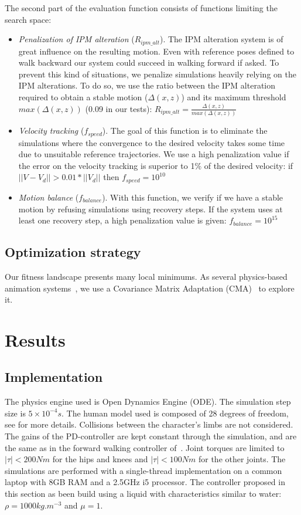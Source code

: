 \documentclass[conference]{acmsiggraph}
\begin{document}
The second part of the evaluation function consists of functions limiting the search space:
\begin{itemize}
\item{\textit{Penalization of IPM alteration} ($R_{ipm\_alt}$). The IPM alteration system is of great influence on the resulting motion. Even with reference poses defined to walk backward our system could succeed in walking forward if asked. To prevent this kind of situations, we penalize simulations heavily relying on the IPM alterations. To do so, we use the ratio between the IPM alteration required to obtain a stable motion ($\Delta(x,z)$) and its maximum threshold $max(\Delta(x,z))$ (0.09 in our tests): $R_{ipm\_alt}=\frac{\Delta(x,z)}{max(\Delta(x,z))}$}
\item{\textit{Velocity tracking} ($f_{speed}$). The goal of this function is to eliminate the simulations where the convergence to the desired velocity takes some time due to unsuitable reference trajectories. We use a high penalization value if the error on the velocity tracking is superior to 1\% of the desired velocity: if $||V-V_d||>0.01*||V_d||$ then $f_{speed}=10^{10}$}
\item{\textit{Motion balance} ($f_{balance}$). With this function, we verify if we have a stable motion by refusing simulations using recovery steps. If the system uses at least one recovery step, a high penalization value is given: $f_{balance}=10^{15}$}
\end{itemize}

\subsection{Optimization strategy}
Our fitness landscape presents many local minimums. As several physics-based animation systems~\cite{geijtenbeek2012simple,tan2011articulated}, we use a Covariance Matrix Adaptation (CMA)~\cite{hansen2006cma} to explore it.

\section{Results}
\label{sec:results}

\subsection{Implementation}
The physics engine used is Open Dynamics Engine (ODE). The simulation step size is $5 \times 10^{-4}s$. The human model used is composed of 28 degrees of freedom, see \cite{coros2009robust} for more details. Collisions between the character's limbs are not considered. The gains of the PD-controller are kept constant through the simulation, and are the same as in the forward walking controller of~\cite{coros2009robust}. Joint torques are limited to $|\tau|<200Nm$  for the hips and knees and $|\tau|<100Nm$  for the other joints. The simulations are performed with a single-thread implementation on a common laptop with 8GB RAM and a 2.5GHz i5 processor. The controller proposed in this section as been build using a liquid with characteristics similar to water: $\rho=1000kg.m^{-3}$ and $\mu=1$.
\end{document}
